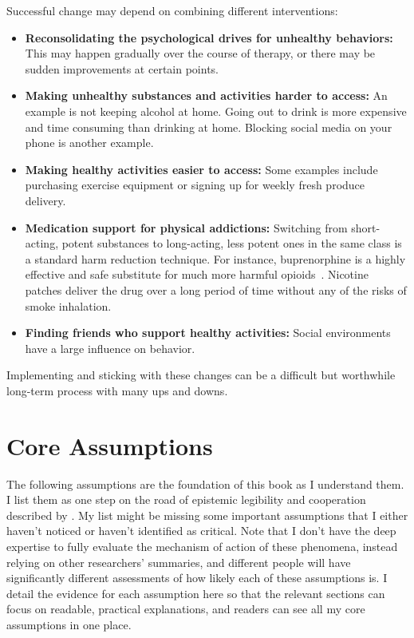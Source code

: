 \documentclass[11pt,oneside]{book}
\let\cite\parencite
\begin{document}
Successful change may depend on combining different interventions:
\begin{itemize}
    \item \textbf{Reconsolidating the psychological drives for unhealthy behaviors:} This may happen gradually over the course of therapy, or there may be sudden improvements at certain points.
    \item \textbf{Making unhealthy substances and activities harder to access:} An example is not keeping alcohol at home. Going out to drink is more expensive and time consuming than drinking at home. Blocking social media on your phone is another example.
    \item \textbf{Making healthy activities easier to access:} Some examples include purchasing exercise equipment or signing up for weekly fresh produce delivery.
    \item \textbf{Medication support for physical addictions:} Switching from short-acting, potent substances to long-acting, less potent ones in the same class is a standard harm reduction technique. For instance, buprenorphine is a highly effective and safe substitute for much more harmful opioids~\cite{Mattickbuprenorphine}. Nicotine patches deliver the drug over a long period of time without any of the risks of smoke inhalation.
    \item \textbf{Finding friends who support healthy activities:} Social environments have a large influence on behavior.
\end{itemize}

Implementing and sticking with these changes can be a difficult but worthwhile long-term process with many ups and downs.


\printglossaries
\label{sec:glossary}

\appendix
{}

\chapter{Core Assumptions}
\label{sec:assumptions}
The following assumptions are the foundation of this book as I understand them. I list them as one step on the road of epistemic legibility and cooperation described by \textcite{nostrandLegibility}. My list might be missing some important assumptions that I either haven't noticed or haven't identified as critical. Note that I don't have the deep expertise to fully evaluate the mechanism of action of these phenomena, instead relying on other researchers' summaries, and different people will have significantly different assessments of how likely each of these assumptions is. I detail the evidence for each assumption here so that the relevant sections can focus on readable, practical explanations, and readers can see all my core assumptions in one place.
\end{document}
